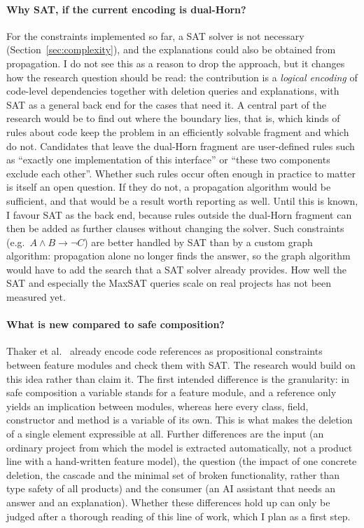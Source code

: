 \documentclass[11pt,a4paper]{article}
\begin{document}
\paragraph{Why SAT, if the current encoding is dual-Horn?}
For the constraints implemented so far, a SAT solver is not necessary
(Section~\ref{sec:complexity}), and the explanations could also be
obtained from propagation. I do not see this as a reason to drop the
approach, but it changes how the research question should be read: the
contribution is a \emph{logical encoding} of code-level dependencies
together with deletion queries and explanations, with SAT as a general
back end for the cases that need it. A central part of the research would be to find out where the boundary
lies, that is, which kinds of rules about code keep the problem in an
efficiently solvable fragment and which do not. Candidates that leave the
dual-Horn fragment are user-defined rules such as ``exactly one
implementation of this interface'' or ``these two components exclude each
other''. Whether such rules occur often enough in practice to matter is
itself an open question. If they do not, a propagation algorithm would be
sufficient, and that would be a result worth reporting as well. Until
this is known, I favour SAT as the back end, because rules outside the
dual-Horn fragment can then be added as further clauses without changing
the solver. Such constraints (e.g.\ $A \land B \to \neg C$) are better
handled by SAT than by a custom graph algorithm: propagation alone no
longer finds the answer, so the graph algorithm would have to add the
search that a SAT solver already provides. How well the SAT and especially the MaxSAT queries scale on
real projects has not been measured yet.

\paragraph{What is new compared to safe composition?}
Thaker et al.~\cite{thaker2007} already encode code references as
propositional constraints between feature modules and check them with
SAT. The research would build on
this idea rather than claim it. The first intended difference is the
granularity: in safe composition a variable stands for a feature module,
and a reference only yields an implication between modules, whereas here
every class, field, constructor and method is a variable of its own. This
is what makes the deletion of a single element expressible at all.
Further differences are the input (an ordinary project from which the model is
extracted automatically, not a product line with a hand-written feature
model), the question (the impact of one concrete deletion, the cascade
and the minimal set of broken functionality, rather than type safety of
all products) and the consumer (an AI assistant that needs an answer and
an explanation). Whether these differences hold up can only be judged
after a thorough reading of this line of work, which I plan as a first
step.
\end{document}
